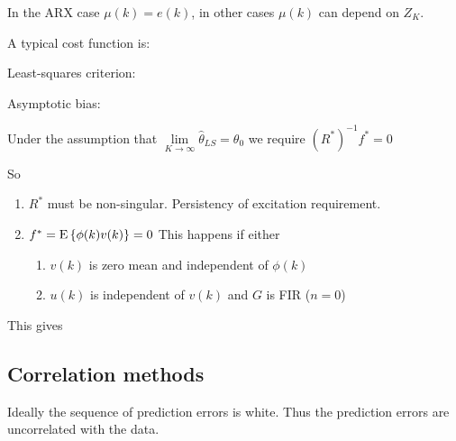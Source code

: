 \documentclass[10pt,a4paper]{scrartcl}
\begin{document}
\begin{multicols*}{2}

In the ARX case $\mu(k)=e(k)$, in other cases $\mu(k)$ can depend on $Z_K$.


A typical cost function is:


Least-squares criterion:


Asymptotic bias:



Under the assumption that $\lim\limits_{K\rightarrow\infty}\hat{\theta}_{LS}=\theta_0$ we require $(R^\ast)^{-1}f^\ast=0$

So

\begin{enumerate}
\item $R^\ast$ must be non-singular. Persistency of excitation requirement.
\item $f^\ast=\text{E}\left\{\phi(k)v(k)\right\}=0$ This happens if either
\begin{enumerate}
\item $v(k)$ is zero mean and independent of $\phi(k)$
\item $u(k)$ is independent of $v(k)$ and $G$ is FIR ($n=0$)
\end{enumerate}
\end{enumerate}

This gives


\subsection{Correlation methods}

Ideally the sequence of prediction errors is white. Thus the prediction errors are uncorrelated with the data.



\end{multicols*}
\end{document}
